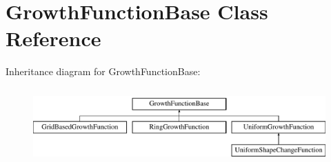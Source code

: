 \hypertarget{classGrowthFunctionBase}{}\section{Growth\+Function\+Base Class Reference}
\label{classGrowthFunctionBase}
Inheritance diagram for Growth\+Function\+Base\+:\begin{figure}[H]
\begin{center}
\leavevmode
\includegraphics[height=2.916667cm]{classGrowthFunctionBase}
\end{center}
\end{figure}
